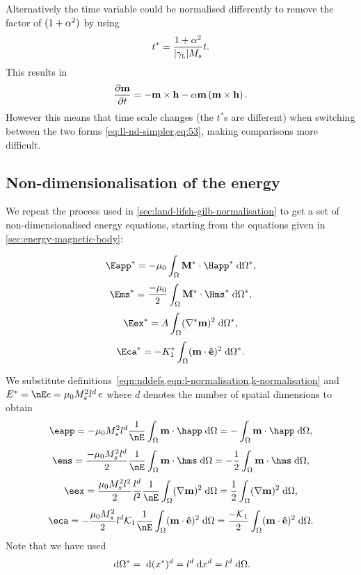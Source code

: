 Alternatively the time variable could be normalised differently to remove the factor of $(1 + \alpha^2)$ by using
\begin{equation}
  t^* = \frac{1 + \alpha^2}{{\left|{\gamma_{\text{\tiny{L}}}} \right|} M_s} t.
\end{equation}
This results in
\begin{equation}
  \frac{\partial \mathbf{m}}{\partial t} = -\mathbf{m} \times \mathbf{h} -\alpha \mathbf{m} \left(\mathbf{m} \times \mathbf{h} \right).
  \label{eq:ll-nd-simpler}
\end{equation}
However this means that time scale changes (\ie the $t^*$s are different) when switching between the two forms \cref{eq:ll-nd-simpler,eq:53}, making comparisons more difficult.


\subsection{Non-dimensionalisation of the energy}
\label{sec:energy-calculations}

We repeat the process used in \cref{sec:land-lifsh-gilb-normalisation} to get a set of non-dimensionalised energy equations, starting from the equations given in \cref{sec:energy-magnetic-body}:

\begin{equation*}
  \Eapp^* = - \mu_0 \int_{\magd} \Mv^* \cdot \Happ^* \d \magd^*,
\end{equation*}
\begin{equation}
  \Ems^* =  \frac{-\mu_0}{2} \int_{\magd} \Mv^* \cdot \Hms^* \d \magd^*,
\end{equation}
\begin{equation*}
  \Eex^* =  \Exchc \int_{\magd} (\nabla^* \mv)^2 \d \magd^*,
\end{equation*}
\begin{equation*}
  \Eca^* =  -\Kone^* \int_\magd (\mv \cdot \ev)^2 \d \magd^*.
\end{equation*}

We substitute definitions~\cref{eqn:nddefs,eqn:l-normalisation,k-normalisation} and $E^* = \nE e = \mu_0 M_s^2 l^d \, e$ where $d$ denotes the number of spatial dimensions to obtain
\begin{equation*}
  \eapp = -\mu_0 M_s^2 l^d \frac{1}{\nE} \int_{\magd} \mv \cdot \happ \d \magd
  = - \int_{\magd} \mv \cdot \happ \d \magd,
\end{equation*}
\begin{equation}
  \ems = \frac{-\mu_0 M_s^2 l^d}{2} \frac{1}{\nE} \int_{\magd} \mv \cdot \hms \d \magd
  = -\frac{1}{2} \int_{\magd} \mv \cdot \hms \d \magd,
\end{equation}
\begin{equation*}
  \eex =  \frac{\mu_0 M_s^2 l^2}{2} \frac{l^d}{l^2} \frac{1}{\nE} \int_{\magd} (\nabla \mv)^2 \d \magd
  = \frac{1}{2} \int_{\magd} (\nabla \mv)^2 \d \magd,
\end{equation*}
\begin{equation*}
  \eca = - \frac{\mu_0 M_s^2}{2 } l^d \kone \frac{1}{\nE} \int_\magd (\mv \cdot \ev)^2 \d \magd
  = \frac{-\kone}{2} \int_\magd (\mv \cdot \ev)^2 \d \magd.
\end{equation*}
Note that we have used
\begin{equation}
  {\; \text{d}} \Omega^* = {\; \text{d}} (x^*)^d = l^d {\; \text{d}} x^d = l^d {\; \text{d}} \Omega.
\end{equation}


